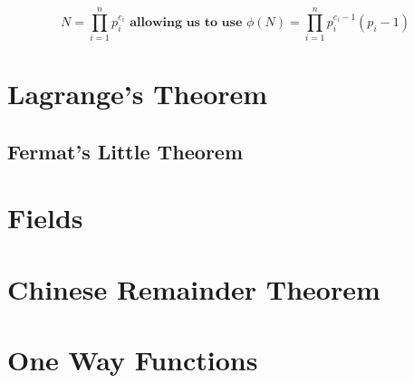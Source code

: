     $$N = \prod_{i=1}^{n}p_{i}^{e_{i}} \textbf{ allowing us to use } \phi(N) = \prod_{i=1}^{n}p_{i}^{e_{i}-1}(p_{i} - 1)$$


    \section{Lagrange's Theorem}
    
        \subsection{Fermat's Little Theorem}
        
    \section{Fields}
    
    \section{Chinese Remainder Theorem}
    
    \section{One Way Functions}
    
